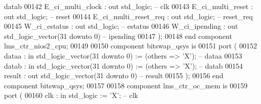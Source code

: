 \begin{DoxyCode}
{       datab}
00142             E\_ci\_multi\_clock                    : \textcolor{keywordflow}{out} \textcolor{comment}{std\_logic};                                        \textcolor{keyword}{--
       clk}
00143             E\_ci\_multi\_reset                    : \textcolor{keywordflow}{out} \textcolor{comment}{std\_logic};                                        \textcolor{keyword}{--
       reset}
00144             E\_ci\_multi\_reset\_req                : \textcolor{keywordflow}{out} \textcolor{comment}{std\_logic};                                        \textcolor{keyword}{--
       reset\_req}
00145             W\_ci\_estatus                        : \textcolor{keywordflow}{out} \textcolor{comment}{std\_logic};                                        \textcolor{keyword}{--
       estatus}
00146             W\_ci\_ipending                       : \textcolor{keywordflow}{out} \textcolor{comment}{std\_logic\_vector}(\textcolor{vhdllogic}{}\textcolor{vhdllogic}{31} \textcolor{keywordflow}{downto} \textcolor{vhdllogic}{}\textcolor{vhdllogic}{0})\textcolor{keyword}{                     --
       ipending}
00147         );
00148     \textcolor{keywordflow}{end} \textcolor{keywordflow}{component} \textcolor{vhdlchar}{lms_ctr_nios2_cpu};
00149 
00150     \textcolor{keywordflow}{component} bitswap\_qsys \textcolor{keywordflow}{is}
00151         \textcolor{keywordflow}{port} (
00152             dataa  : \textcolor{keywordflow}{in}  \textcolor{comment}{std\_logic\_vector}(\textcolor{vhdllogic}{}\textcolor{vhdllogic}{31} \textcolor{keywordflow}{downto} \textcolor{vhdllogic}{}\textcolor{vhdllogic}{0}) := (\textcolor{keywordflow}{others} => 'X'); \textcolor{keyword}{-- dataa}
00153             datab  : \textcolor{keywordflow}{in}  \textcolor{comment}{std\_logic\_vector}(\textcolor{vhdllogic}{}\textcolor{vhdllogic}{31} \textcolor{keywordflow}{downto} \textcolor{vhdllogic}{}\textcolor{vhdllogic}{0}) := (\textcolor{keywordflow}{others} => 'X'); \textcolor{keyword}{-- datab}
00154             result : \textcolor{keywordflow}{out} \textcolor{comment}{std\_logic\_vector}(\textcolor{vhdllogic}{}\textcolor{vhdllogic}{31} \textcolor{keywordflow}{downto} \textcolor{vhdllogic}{}\textcolor{vhdllogic}{0})\textcolor{keyword}{                     -- result}
00155         );
00156     \textcolor{keywordflow}{end} \textcolor{keywordflow}{component} \textcolor{vhdlchar}{bitswap_qsys};
00157 
00158     \textcolor{keywordflow}{component} lms\_ctr\_oc\_mem \textcolor{keywordflow}{is}
00159         \textcolor{keywordflow}{port} (
00160             clk        : \textcolor{keywordflow}{in}  \textcolor{comment}{std\_logic}                     := 'X';             \textcolor{keyword}{-- clk}

\end{DoxyCode}
